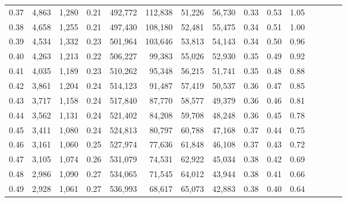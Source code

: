 \begin{tabular}{rrrcrrrrrrrrrrr}
0.37 &   4,863 &   1,280 &                                       0.21 &  492,772 &  112,838 &   51,226 &   56,730 &  0.33 &  0.53 &                         1.05 \\
0.38 &   4,658 &   1,255 &                                       0.21 &  497,430 &  108,180 &   52,481 &   55,475 &  0.34 &  0.51 &                         1.00 \\
0.39 &   4,534 &   1,332 &                                       0.23 &  501,964 &  103,646 &   53,813 &   54,143 &  0.34 &  0.50 &                         0.96 \\
0.40 &   4,263 &   1,213 &                                       0.22 &  506,227 &   99,383 &   55,026 &   52,930 &  0.35 &  0.49 &                         0.92 \\
0.41 &   4,035 &   1,189 &                                       0.23 &  510,262 &   95,348 &   56,215 &   51,741 &  0.35 &  0.48 &                         0.88 \\
0.42 &   3,861 &   1,204 &                                       0.24 &  514,123 &   91,487 &   57,419 &   50,537 &  0.36 &  0.47 &                         0.85 \\
0.43 &   3,717 &   1,158 &                                       0.24 &  517,840 &   87,770 &   58,577 &   49,379 &  0.36 &  0.46 &                         0.81 \\
0.44 &   3,562 &   1,131 &                                       0.24 &  521,402 &   84,208 &   59,708 &   48,248 &  0.36 &  0.45 &                         0.78 \\
0.45 &   3,411 &   1,080 &                                       0.24 &  524,813 &   80,797 &   60,788 &   47,168 &  0.37 &  0.44 &                         0.75 \\
0.46 &   3,161 &   1,060 &                                       0.25 &  527,974 &   77,636 &   61,848 &   46,108 &  0.37 &  0.43 &                         0.72 \\
0.47 &   3,105 &   1,074 &                                       0.26 &  531,079 &   74,531 &   62,922 &   45,034 &  0.38 &  0.42 &                         0.69 \\
0.48 &   2,986 &   1,090 &                                       0.27 &  534,065 &   71,545 &   64,012 &   43,944 &  0.38 &  0.41 &                         0.66 \\
0.49 &   2,928 &   1,061 &                                       0.27 &  536,993 &   68,617 &   65,073 &   42,883 &  0.38 &  0.40 &                         0.64 \\

\end{tabular}
